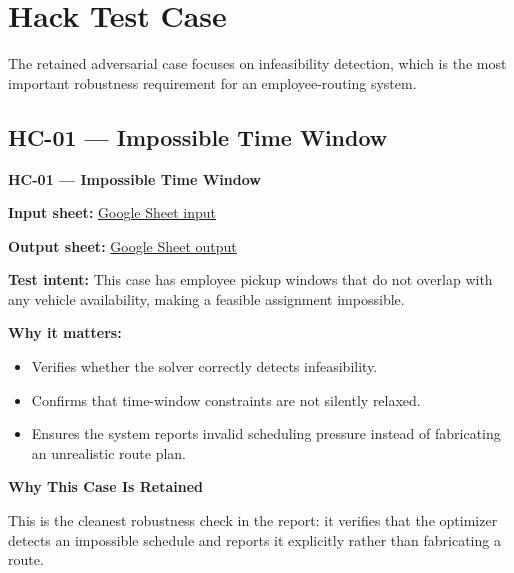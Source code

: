 \documentclass[11pt,a4paper]{article}
\newenvironment{callout}[1]{%
  \par\medskip
  \noindent\textbf{#1}\par
  \small\itshape
}{%
  \par\medskip\normalfont
}
\newenvironment{insightbox}[1][Discussion]{\begin{callout}{#1}}{\end{callout}}
\newenvironment{hackbox}[1][Hack Test Case]{\begin{callout}{#1}}{\end{callout}}
\begin{document}
\FloatBarrier

\section{Hack Test Case}
\label{sec:hack}

The retained adversarial case focuses on infeasibility detection, which is the most important robustness requirement for an employee-routing system.

\subsection{HC-01 --- Impossible Time Window}

\begin{hackbox}[HC-01 --- Impossible Time Window]
\small
\textbf{Input sheet:} \href{https://docs.google.com/spreadsheets/d/10i1GiT_c1rK27x5uJG4iGw2c_u7VGDNo/edit?gid=736445089#gid=736445089}{Google Sheet input}

\textbf{Output sheet:} \href{https://docs.google.com/spreadsheets/d/1cEbebLy069o2lC6KWmAdVSrs0sOf61_J/edit?gid=569214064#gid=569214064}{Google Sheet output}

\textbf{Test intent:} This case has employee pickup windows that do not overlap with any vehicle availability, making a feasible assignment impossible.

\textbf{Why it matters:}
\begin{itemize}[leftmargin=14pt,itemsep=1pt]
  \item Verifies whether the solver correctly detects infeasibility.
  \item Confirms that time-window constraints are not silently relaxed.
  \item Ensures the system reports invalid scheduling pressure instead of fabricating an unrealistic route plan.
\end{itemize}
\end{hackbox}

\begin{insightbox}[Why This Case Is Retained]
\small This is the cleanest robustness check in the report: it verifies that the optimizer detects an impossible schedule and reports it explicitly rather than fabricating a route.
\end{insightbox}

\end{document}
